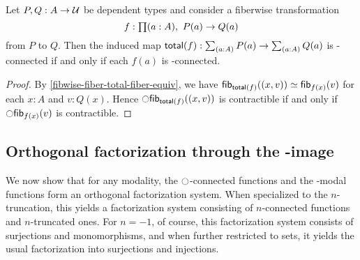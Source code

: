 \begin{lem}\label{prop:nconn_fiber_to_total}
Let $P,Q:A\to\mathcal{U}$ be dependent types and consider a fiberwise transformation
\begin{equation*}
f:\prd{a:A} P(a)\to Q(a)
\end{equation*}
from $P$ to $Q$. Then the induced map $\total f: \sm{a:A}P(a) \to \sm{a:A} Q(a)$ is \modal-connected if and only if each $f(a)$ is \modal-connected. 
\end{lem}

\begin{proof}
By \autoref{fibwise-fiber-total-fiber-equiv}, we have
${\mathsf{fib}}_{\mathsf{total}(f)}({(x,v)})\simeq{\mathsf{fib}}_{f(x)}(v)$
for each $x:A$ and $v:Q(x)$. Hence $\ocircle{\mathsf{fib}}_{\mathsf{total}(f)}({(x,v)})$ is contractible if and only if
$\ocircle{\mathsf{fib}}_{f(x)}(v)$ is contractible.
\end{proof}


\subsection{Orthogonal factorization through the \modal-image}\label{sec:image_factorization}

We now show that for any modality, the $\ocircle$-connected functions and the \modal-modal functions form an orthogonal factorization system.
When specialized to the $n$-truncation, this yields a factorization system consisting of $n$-connected functions and $n$-truncated ones.
For $n=-1$, of course, this factorization system consists of surjections and monomorphisms, and when further restricted to sets, it yields the usual factorization into surjections and injections.





